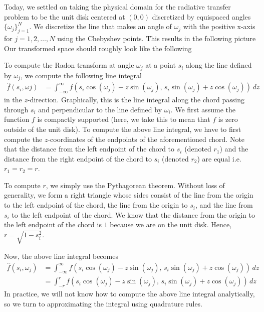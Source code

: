 \documentclass[12pt]{article}
\begin{document}
Today, we settled on taking the physical domain for the radiative transfer problem to be the unit disk centered at $(0, 0)$ discretized by equispaced angles $\{ \omega_j \}_{j=1}^{N}$.
We discretize the line that makes an angle of $\omega_{j}$ with the positive x-axis for $j = 1, 2, \hdots, N$ using the Chebyshev points.
This results in the following picture
Our transformed space should roughly look like the following
\par 
To compute the Radon transform at angle $\omega_{j}$ at a point $s_{i}$ along the line defined by $\omega_{j}$, we compute the following line integral
\begin{align*}
	\hat{f}(s_{i}, \omega{j}) & = \int_{-\infty}^{\infty} f(s_{i} \cos (\omega_{j}) - z \sin (\omega_{j}), \, s_{i} \sin (\omega_{j}) + z \cos (\omega_{j})) \, dz
\end{align*}
in the $z$-direction.
Graphically, this is the line integral along the chord passing through $s_{i}$ and perpendicular to the line defined by $\omega_{i}$.
We first assume the function $f$ is compactly supported (here, we take this to mean that $f$ is zero outside of the unit disk).
To compute the above line integral, we have to first compute the $z$-coordinates of the endpoints of the aforementioned chord.
Note that the distance from the left endpoint of the chord to $s_{i}$ (denoted $r_{1}$) and the distance from the right endpoint of the chord to $s_{i}$ (denoted $r_{2}$) are equal i.e. $r_{1} = r_{2} = r$.
\par 
To compute $r$, we simply use the Pythagorean theorem.
Without loss of generality, we form a right triangle whose sides consist of the line from the origin to the left endpoint of the chord, the line from the origin to $s_{i}$, and the line from $s_{i}$ to the left endpoint of the chord.
We know that the distance from the origin to the left endpoint of the chord is $1$ because we are on the unit disk. 
Hence, $r = \sqrt{1 - s_{i}^{2}}$. 
\par 
Now, the above line integral becomes
\begin{align*}
	\hat{f}(s_{i}, \omega_{j}) & = \int_{-\infty}^{\infty} f(s_{i} \cos (\omega_{j}) - z \sin (\omega_{j}), \, s_{i} \sin (\omega_{j}) + z \cos (\omega_{j})) \, dz \\
	& = \int_{-r}^{r} f(s_{i} \cos (\omega_{j}) - z \sin (\omega_{j}), \, s_{i} \sin (\omega_{j}) + z \cos (\omega_{j})) \, dz
\end{align*}
In practice, we will not know how to compute the above line integral analytically, so we turn to approximating the integral using quadrature rules.
\end{document}
